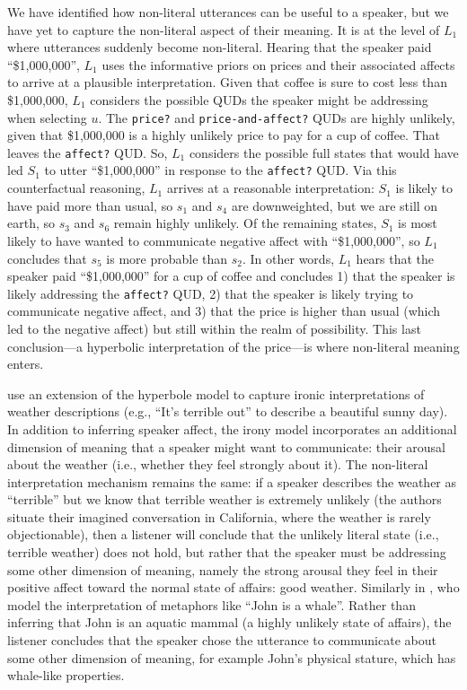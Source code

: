 \documentclass{sp}
\begin{document}
We have identified how non-literal utterances can be useful to a speaker, but we have yet to capture the non-literal aspect of their meaning. It is at the level of $L_1$ where utterances suddenly become non-literal. Hearing that the speaker paid ``\$1,000,000'', $L_1$ uses the informative priors on prices and their associated affects to arrive at a plausible interpretation. Given that coffee is sure to cost less than \$1,000,000, $L_1$ considers the possible QUDs the speaker might be addressing when selecting $u$. The \texttt{price?} and \texttt{price-and-affect?} QUDs are highly unlikely, given that \$1,000,000 is a highly unlikely price to pay for a cup of coffee. That leaves the \texttt{affect?} QUD. So, $L_1$ considers the possible full states that would have led $S_1$ to utter ``\$1,000,000'' in response to the \texttt{affect?} QUD. Via this counterfactual reasoning, $L_1$ arrives at a reasonable interpretation: $S_1$ is likely to have paid more than usual, so $s_1$ and $s_4$ are downweighted, but we are still on earth, so $s_3$ and $s_6$ remain highly unlikely. Of the remaining states, $S_1$ is most likely to have wanted to communicate negative affect with ``\$1,000,000'', so $L_1$ concludes that $s_5$ is more probable than $s_2$. In other words, $L_1$ hears that the speaker paid ``\$1,000,000'' for a cup of coffee and concludes 1) that the speaker is likely addressing the \texttt{affect?} QUD, 2) that the speaker is likely trying to communicate negative affect, and 3) that the price is higher than usual (which led to the negative affect) but still within the realm of possibility. This last conclusion---a hyperbolic interpretation of the price---is where non-literal meaning enters.

\cite{kaogoodman2015} use an extension of the hyperbole model to capture ironic interpretations of weather descriptions (e.g., ``It's terrible out'' to describe a beautiful sunny day). In addition to inferring speaker affect, the irony model incorporates an additional dimension of meaning that a speaker might want to communicate: their arousal about the weather (i.e., whether they feel strongly about it). The non-literal interpretation mechanism remains the same: if a speaker describes the weather as ``terrible'' but we know that terrible weather is extremely unlikely (the authors situate their imagined conversation in California, where the weather is rarely objectionable), then a listener will conclude that the unlikely literal state (i.e., terrible weather) does not hold, but rather that the speaker must be addressing some other dimension of meaning, namely the strong arousal they feel in their positive affect toward the normal state of affairs: good weather. Similarly in \cite{kaoetal2014metaphor}, who model the interpretation of metaphors like ``John is a whale''. Rather than inferring that John is an aquatic mammal (a highly unlikely state of affairs), the listener concludes that the speaker chose the utterance to communicate about some other dimension of meaning, for example John's physical stature, which has whale-like properties.
\end{document}
